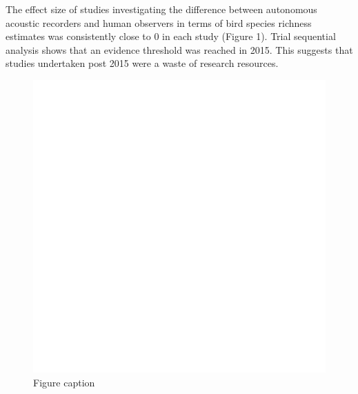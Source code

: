 \documentclass[]{article}
\begin{document}
The effect size of studies investigating the difference between
autonomous acoustic recorders and human observers in terms of bird
species richness estimates was consistently close to 0 in each study
(Figure 1). Trial sequential analysis shows that an evidence threshold
was reached in 2015. This suggests that studies undertaken post 2015
were a waste of research resources.

\begin{figure}
\centering
\includegraphics{Figures/Figure1.png}
\caption{Figure caption \label{figurelabel}}
\end{figure}
\end{document}
